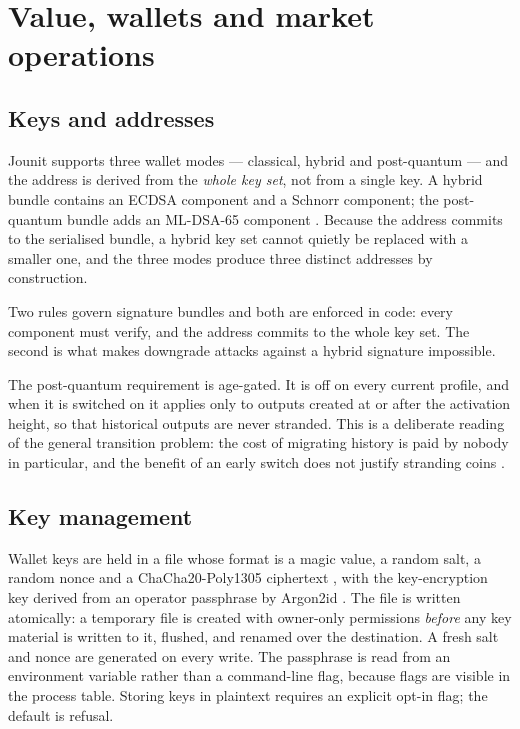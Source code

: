 \documentclass{article}
\begin{document}
\section{Value, wallets and market operations}
\label{sec:wallets}

\subsection{Keys and addresses}

Jounit supports three wallet modes --- classical, hybrid and post-quantum ---
and the address is derived from the \emph{whole key set}, not from a single
key. A hybrid bundle contains an ECDSA component and a Schnorr component; the
post-quantum bundle adds an ML-DSA-65 component \cite{nist-fips204}. Because
the address commits to the serialised bundle, a hybrid key set cannot quietly
be replaced with a smaller one, and the three modes produce three distinct
addresses by construction.

Two rules govern signature bundles and both are enforced in code: every
component must verify, and the address commits to the whole key set. The
second is what makes downgrade attacks against a hybrid signature impossible.

The post-quantum requirement is age-gated. It is off on every current profile,
and when it is switched on it applies only to outputs created at or after the
activation height, so that historical outputs are never stranded. This is a
deliberate reading of the general transition problem: the cost of migrating
history is paid by nobody in particular, and the benefit of an early switch
does not justify stranding coins \cite{nist-ir8547}.

\subsection{Key management}

Wallet keys are held in a file whose format is a magic value, a random salt, a
random nonce and a ChaCha20-Poly1305 ciphertext \cite{rfc8439}, with the
key-encryption key derived from an operator passphrase by Argon2id
\cite{rfc9106}. The file is written atomically: a temporary file is created
with owner-only permissions \emph{before} any key material is written to it,
flushed, and renamed over the destination. A fresh salt and nonce are generated
on every write. The passphrase is read from an environment variable rather than
a command-line flag, because flags are visible in the process table. Storing
keys in plaintext requires an explicit opt-in flag; the default is refusal.
\end{document}
